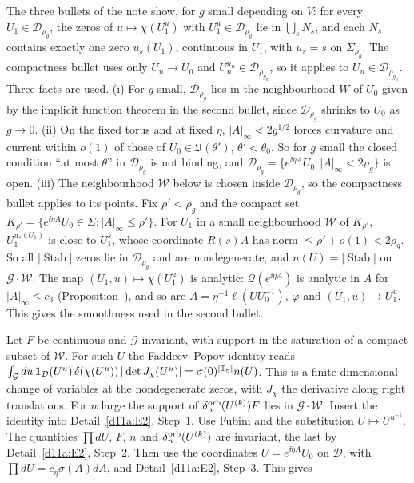 \begin{detail}
\begin{step}
\end{step}
\begin{step}
The three bullets of the note show, for $g$ small depending on $V$: for every $U_1\in\mathcal D_{\rho_g}$, the zeros of $u\mapsto\chi(U_1^u)$ with $U_1^u\in\mathcal D_{\rho_g}$ lie in $\bigcup_sN_s$, and each $N_s$ contains exactly one zero $u_s(U_1)$, continuous in $U_1$, with $u_s=s$ on $\Sigma_{\rho_g}$. The compactness bullet uses only $U_n\to U_0$ and $U_n^{u_n}\in\mathcal D_{\rho_{g_n}}$, so it applies to $U_n\in\mathcal D_{\rho_{g_n}}$. Three facts are used. (i) For $g$ small, $\mathcal D_{\rho_g}$ lies in the neighbourhood $W$ of $U_0$ given by the implicit function theorem in the second bullet, since $\mathcal D_{\rho_g}$ shrinks to $U_0$ as $g\to0$. (ii) On the fixed torus and at fixed $\eta$, $|A|_\infty<2g^{1/2}$ forces curvature and current within $o(1)$ of those of $U_0\in\mathfrak U(\theta')$, $\theta'<\theta_0$. So for $g$ small the closed condition ``at most $\theta$'' in $\mathcal D_{\rho_g}$ is not binding, and $\mathcal D_{\rho_g}=\{e^{\ii\eta A}U_0:|A|_\infty<2\rho_g\}$ is open. (iii) The neighbourhood $\mathcal W$ below is chosen inside $\mathcal D_{\rho_g}$, so the compactness bullet applies to its points. Fix $\rho'<\rho_g$ and the compact set $K_{\rho'}=\{e^{\ii\eta A}U_0\in\Sigma:|A|_\infty\le\rho'\}$. For $U_1$ in a small neighbourhood $\mathcal W$ of $K_{\rho'}$, $U_1^{u_s(U_1)}$ is close to $U_1^s$, whose coordinate $R(s)A$ has norm $\le\rho'+o(1)<2\rho_g$. So all $|\operatorname{Stab}|$ zeros lie in $\mathcal D_{\rho_g}$ and are nondegenerate, and $n(U)=|\operatorname{Stab}|$ on $\mathcal G\cdot\mathcal W$. The map $(U_1,u)\mapsto\chi(U_1^u)$ is analytic: $\mathcal Q(e^{\ii\eta A})$ is analytic in $A$ for $|A|_\infty\le c_3$ (Proposition~), and so are $A=\eta^{-1}\ell(UU_0^{-1})$, $\varphi$ and $(U_1,u)\mapsto U_1^u$. This gives the smoothness used in the second bullet.
\end{step}
\begin{step}
Let $F$ be continuous and $\mathcal G$-invariant, with support in the saturation of a compact subset of $\mathcal W$. For such $U$ the Faddeev--Popov identity reads $\int_{\mathcal G}du\,\mathbf 1_{\mathcal D}(U^u)\,\delta(\chi(U^u))\,|\det J_\chi(U^u)|=\sigma(0)^{|\mathbb T_\eta|}n(U)$. This is a finite-dimensional change of variables at the nondegenerate zeros, with $J_\chi$ the derivative along right translations. For $n$ large the support of $\delta^{\rm orb}_n(U^{(k)})F$ lies in $\mathcal G\cdot\mathcal W$. Insert the identity into Detail~\ref{d11a:E2}, Step~1. Use Fubini and the substitution $U\mapsto U^{u^{-1}}$. The quantities $\prod dU$, $F$, $n$ and $\delta^{\rm orb}_n(U^{(k)})$ are invariant, the last by Detail~\ref{d11a:E2}, Step~2. Then use the coordinates $U=e^{\ii\eta A}U_0$ on $\mathcal D$, with $\prod dU=c_\eta\sigma(A)dA$, and Detail~\ref{d11a:E2}, Step~3. This gives

\end{step}
\end{detail}
